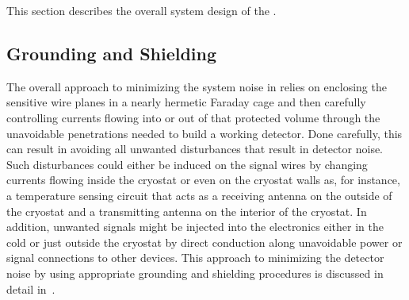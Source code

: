 This section describes the overall
system design of the .

\begin{comment}
, starting in
\ref{sec:fdsp-tpcelec-design-grounding} with a description of the
grounding and shielding scheme adopted in the \dword{dune} \dword{spmod}
to minimize the overall noise in the detector, followed in
\ref{sec:fdsp-tpcelec-design-bias} by a discussion of the bias
voltage distribution system. Later, we describe in 
\ref{sec:fdsp-tpcelec-design-femb} the \dwords{femb}, including
the design of the \dwords{asic} that are being considered for
use in \dword{dune}. In~\ref{sec:fdsp-tpcelec-design-infrastructure}
we discuss the infrastructure for the \dword{ce} inside the cryostat,
that includes the cold boxes that shield the \dwords{femb}, the
cold cables, and the cables trays. Then in
\ref{sec:fdsp-tpcelec-design-ft}-\ref{sec:fdsp-tpcelec-design-timing} we discuss 
the infrastructure on the top of the cryostat, including the
feedthroughs, the \dwords{wiec}, the timing distribution and
synchronization system, and the services that provide the low
voltage power and the bias voltage to the \dword{ce}. Finally,
we conclude in~\ref{sec:fdsp-tpcelec-overview-remaining}
with a discussion of the design maturity and of
the remaining prototype activities that are required prior to
the beginning of he detector construction. Other aspects of
the system design, pertaining to the grounding of other 
detector components, are discussed in Section~\ref{sec:fdsp-tpcelec-interfaces}.
\end{comment}

\subsection{Grounding and Shielding}
\label{sec:fdsp-tpcelec-design-grounding}

The overall approach to minimizing the system noise in  
relies on enclosing the sensitive wire planes in a nearly hermetic 
Faraday cage and then carefully controlling currents flowing into or 
out of that protected volume through the unavoidable penetrations 
needed to build a working detector. Done carefully, this can result 
in avoiding all unwanted disturbances that result in detector noise. 
Such disturbances could either be induced on the signal wires by 
changing currents flowing inside the cryostat or even on the cryostat 
walls as, for instance, a temperature sensing circuit that acts as a 
receiving antenna on the outside of the cryostat and a transmitting 
antenna on the interior of the cryostat. In addition, unwanted signals 
might be injected into the electronics either in the cold or just 
outside the cryostat by direct conduction along unavoidable power 
or signal connections to other devices. This approach to minimizing
the detector noise by using appropriate grounding and shielding procedures
is discussed in detail in~\cite{radekaNoise}.

